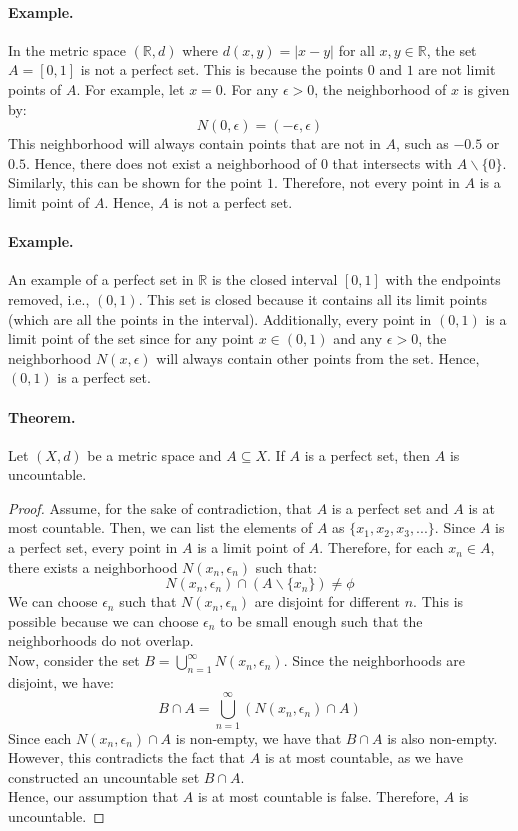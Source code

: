 \documentclass[openany]{book}
\numberwithin{equation}{section}
\begin{document}
\paragraph{Example.}

    In the metric space $(\mathbb{R}, d)$ where $d(x, y) = |x - y|$ for all $x, y \in \mathbb{R}$, the set $A = [0, 1]$ is not a perfect set. This is because the points $0$ and $1$ are not limit points of $A$. For example, let $x = 0$. For any $\epsilon > 0$, the neighborhood of $x$ is given by:
    $$N(0, \epsilon) = (-\epsilon, \epsilon)$$
    This neighborhood will always contain points that are not in $A$, such as $-0.5$ or $0.5$. Hence, there does not exist a neighborhood of $0$ that intersects with $A \backslash \{0\}$. Similarly, this can be shown for the point $1$. Therefore, not every point in $A$ is a limit point of $A$. Hence, $A$ is not a perfect set.
\par
\paragraph{Example.}

    An example of a perfect set in $\mathbb{R}$ is the closed interval $[0, 1]$ with the endpoints removed, i.e., $(0, 1)$. This set is closed because it contains all its limit points (which are all the points in the interval). Additionally, every point in $(0, 1)$ is a limit point of the set since for any point $x \in (0, 1)$ and any $\epsilon > 0$, the neighborhood $N(x, \epsilon)$ will always contain other points from the set. Hence, $(0, 1)$ is a perfect set.
\par
\paragraph{Theorem.}

    Let $(X, d)$ be a metric space and $A \subseteq X$. If $A$ is a perfect set, then $A$ is uncountable.
\par
\begin{proof}
    Assume, for the sake of contradiction, that $A$ is a perfect set and $A$ is at most countable. Then, we can list the elements of $A$ as $\{x_1, x_2, x_3, ...\}$. Since $A$ is a perfect set, every point in $A$ is a limit point of $A$. Therefore, for each $x_n \in A$, there exists a neighborhood $N(x_n, \epsilon_n)$ such that:
    $$N(x_n, \epsilon_n) \cap (A \backslash \{x_n\}) \neq \phi$$
    We can choose $\epsilon_n$ such that $N(x_n, \epsilon_n)$ are disjoint for different $n$. This is possible because we can choose $\epsilon_n$ to be small enough such that the neighborhoods do not overlap. \\
    Now, consider the set $B = \bigcup_{n=1}^{\infty} N(x_n, \epsilon_n)$. Since the neighborhoods are disjoint, we have:
    $$B \cap A = \bigcup_{n=1}^{\infty} (N(x_n, \epsilon_n) \cap A)$$
    Since each $N(x_n, \epsilon_n) \cap A$ is non-empty, we have that $B \cap A$ is also non-empty. However, this contradicts the fact that $A$ is at most countable, as we have constructed an uncountable set $B \cap A$. \\ 
    Hence, our assumption that $A$ is at most countable is false. Therefore, $A$ is uncountable.
\end{proof}
\end{document}
